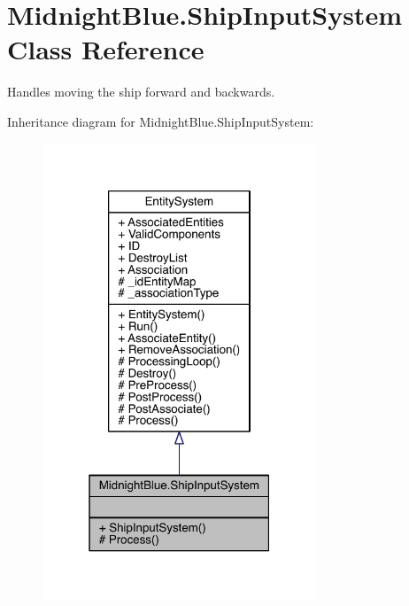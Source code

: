 \hypertarget{class_midnight_blue_1_1_ship_input_system}{}\section{Midnight\+Blue.\+Ship\+Input\+System Class Reference}
\label{class_midnight_blue_1_1_ship_input_system}


Handles moving the ship forward and backwards.  




Inheritance diagram for Midnight\+Blue.\+Ship\+Input\+System\+:
\nopagebreak
\begin{figure}[H]
\begin{center}
\leavevmode
\includegraphics[width=232pt]{class_midnight_blue_1_1_ship_input_system__inherit__graph}
\end{center}
\end{figure}


